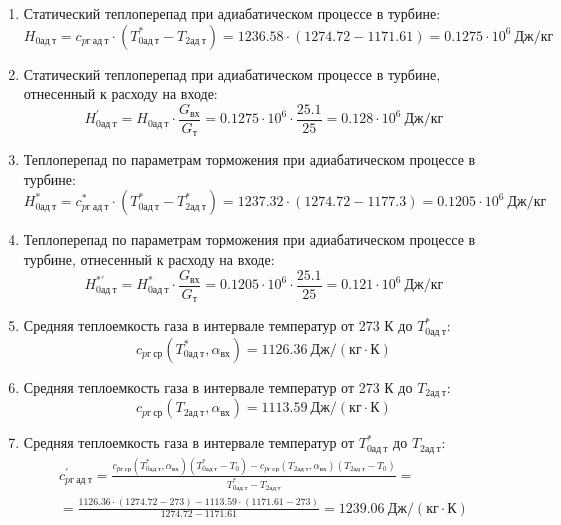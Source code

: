 \documentclass[a4paper,10pt]{article}
\begin{document}
\begin{enumerate}
        \item Статический теплоперепад при адиабатическом процессе в турбине:
        \[
            H_{0ад\ т} = c_{pг\ ад\ т} \cdot \left(
            T_{0ад\ т}^* - T_{2ад\ т}
            \right) =
            1236.58 \cdot \left(
            1274.72 - 1171.61
            \right) =
            0.1275 \cdot 10^6 \ Дж/кг
        \]

        \item Статический теплоперепад при адиабатическом процессе в турбине, отнесенный к расходу на входе:
        \[
            H_{0ад\ т}^\prime = H_{0ад\ т} \cdot \frac{ G_{вх} }{ G_т }  =
                0.1275 \cdot 10^6 \cdot
                \frac{ 25.1 }{ 25 } =
            0.128 \cdot 10^6 \ Дж/кг
        \]

        \item Теплоперепад по параметрам торможения при адиабатическом процессе в турбине:
        \[
            H_{0ад\ т}^* = c_{pг\ ад\ т}^* \cdot \left(
            T_{0ад\ т}^* - T_{2ад\ т}^*
            \right) =
            1237.32 \cdot \left(
            1274.72 - 1177.3
            \right) =
            0.1205 \cdot 10^6 \ Дж/кг
        \]

        \item Теплоперепад по параметрам торможения при адиабатическом процессе в турбине, отнесенный к расходу на входе:
        \[
            H_{0ад\ т}^{*\prime} = H_{0ад\ т}^* \cdot \frac{ G_{вх} }{ G_т }  =
                0.1205 \cdot 10^6 \cdot
                \frac{ 25.1 }{ 25 } =
            0.121 \cdot 10^6 \ Дж/кг
        \]

        \item Средняя теплоемкость газа в интервале температур от 273 К до $T_{0ад\ т}^*$:
        \[
            c_{pг\ ср} (T_{0ад\ т}^*, \alpha_{вх}) =
            1126.36 \ Дж/(кг \cdot К)
        \]

        \item Средняя теплоемкость газа в интервале температур от 273 К до $T_{2ад\ т}$:
        \[
            c_{pг\ ср} (T_{2ад\ т}, \alpha_{вх}) =
            1113.59 \ Дж/(кг \cdot К)
        \]

        \item Средняя теплоемкость газа в интервале температур от $T_{0ад\ т}^*$ до $T_{2ад\ т}$:
        \begin{gather*}
            c_{pг\ ад\ т}^\prime = \frac{
		        c_{pг\ ср} (T_{0ад\ т}^*, \alpha_{вх}) (T_{0ад\ т}^* - T_0) - c_{pг\ ср} (T_{2ад\ т}, \alpha_{вх})(T_{2ад\ т} - T_0)
		    }{
		        T_{0ад\ т}^* - T_{2ад\ т}} =\\
            =\frac{
		        1126.36 \cdot
                (1274.72 - 273) -
		        1113.59 \cdot
                (1171.61 - 273)
		    }{
		        1274.72 - 1171.61} =
		    1239.06 \ Дж / (кг \cdot К)\\
        \end{gather*}


\end{enumerate}
\end{document}
